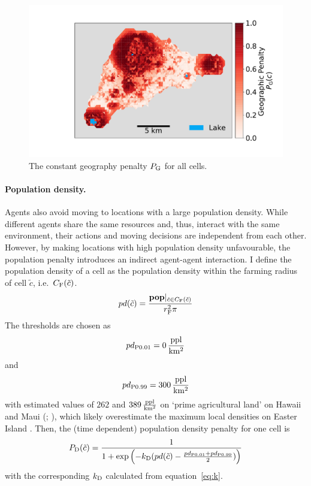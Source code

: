 \begin{figure}
	\centering
	\includegraphics[width=1\linewidth]{images/Plot_PG}
	\caption{The constant geography penalty $P_{\rm G}$ for all cells.}
	\label{fig:P_G}
\end{figure}

\paragraph{Population density.} %
Agents also avoid moving to locations with a large population density.
While different agents share the same resources and, thus, interact with the same environment, their actions and moving decisions are independent from each other. 
However, by making locations with high population density unfavourable, the population penalty introduces an indirect agent-agent interaction. 
I define the population density of a cell as the population density within the farming radius of cell $\tilde{c}$, i.e.\ $C_{\rm F}(\tilde{c})$.
\begin{equation}
pd (\tilde{c}) = \frac{\mathbf{pop}|_{\hat{c} \in C_{\rm F}(\tilde{c}) }}{r_{\rm F}^2 \pi}
\end{equation}
The thresholds are chosen as
\begin{equation}
pd_{\rm P0.01} = 0 \, {\rm \frac{ppl}{km^2}}
\end{equation}
and 
\begin{equation}
pd_{\rm P0.99} = 300 \, {\rm \frac{ppl}{km^2}}
\end{equation}
with estimated values of $262$ and $389\, {\rm \frac{ppl}{km^2}}$ on `prime agricultural land' on Hawaii and Maui (; ), which likely overestimate the maximum local densities on Easter Island \citep{Puleston2017}. %
Then, the (time dependent) population density penalty for one cell is
\begin{equation}
P_{\rm D}(\tilde{c}) = \frac{1}{1+\exp\left( - k_{\rm D} (pd(\tilde{c})-\frac{pd_{\rm P0.01} + pd_{\rm P0.99}}{2}) \right)}
\end{equation}
with the corresponding $k_{\rm D}$ calculated from equation~\ref{eq:k}.
		
